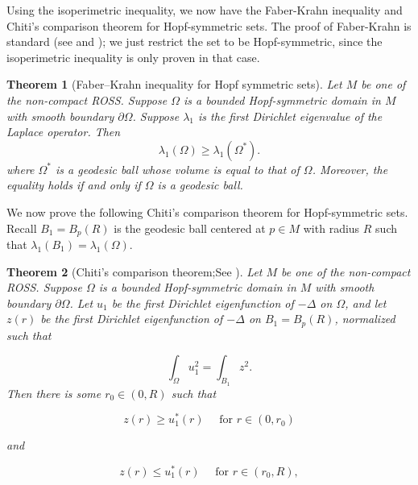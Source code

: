 \documentclass{amsart}
\numberwithin{equation}{section}
\theoremstyle{plain}
\newtheorem{theorem}{Theorem}[section]
\theoremstyle{definition}
\theoremstyle{remark}
\begin{document}
Using the isoperimetric inequality, we now have the Faber-Krahn inequality and Chiti's comparison theorem for Hopf-symmetric sets. The proof of Faber-Krahn is standard (see \cite[chapter~4]{chavel1984eigenvalues} and \cite[section~2.4]{ling2010bounds}); we just restrict the set to be Hopf-symmetric, since the isoperimetric inequality is only proven in that case.
\begin{theorem}[Faber–Krahn inequality for Hopf symmetric sets]\label{FaberKrahn}
     Let $M$ be one of the non-compact ROSS. Suppose $\Omega$ is a bounded Hopf-symmetric domain in $M$ with smooth boundary $\partial \Omega$. Suppose $\lambda_1$ is the first Dirichlet eigenvalue of the Laplace operator. Then
$$
\lambda_1(\Omega) \geq \lambda_1\left(\Omega^*\right) .
$$
where $\Omega^*$ is a geodesic ball whose volume is equal to that of $\Omega$.
Moreover, the equality holds if and only if $\Omega$ is a geodesic ball.
\end{theorem}

We now prove the following Chiti's comparison theorem for Hopf-symmetric sets. Recall $B_1= B_p(R)$ is the geodesic ball centered at $p\in M$ with radius $R$ such that $\lambda_1(B_1)= \lambda_1(\Omega)$. 
\begin{theorem}[Chiti's comparison theorem;See \cite{MR652376, MR652928,MR718816,benguria2007second}]\label{ChitiCompThm}
Let $M$ be one of the non-compact ROSS. Suppose $\Omega$ is a bounded Hopf-symmetric domain in $M$ with smooth boundary $\partial \Omega$. Let $u_1$ be the first Dirichlet eigenfunction of $-\Delta$ on $\Omega$, and let $z(r)$ be the first Dirichlet eigenfunction of $-\Delta$ on $B_1= B_p(R)$, normalized such that

$$
\int_{\Omega} u_1^2 =\int_{B_1} z^2  .
$$
Then there is some $r_0 \in(0, R)$ such that

$$
z(r) \geq u_1^*(r) \quad \text { for } r \in\left(0, r_0\right)
$$

and

$$
z(r) \leq u_1^*(r) \quad \text { for } r \in\left(r_0, R\right),
$$

\end{theorem}
\end{document}
